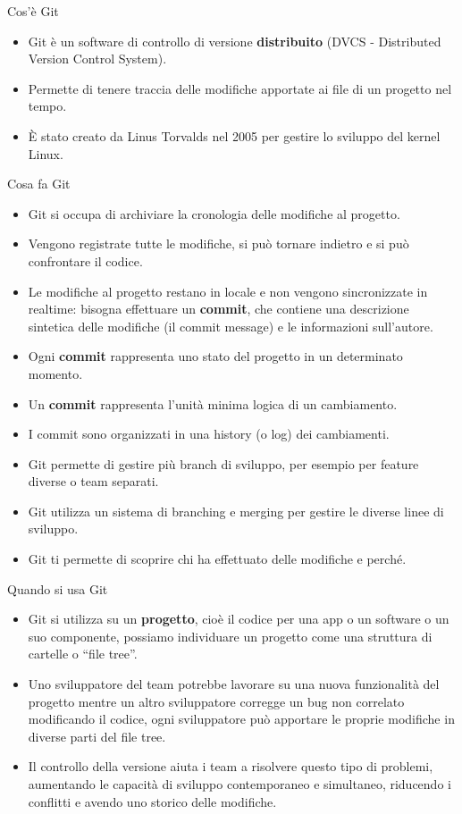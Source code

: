 \documentclass[aspectratio=169,handout,10pt]{beamer}
\begin{document}
\begin{frame}{Cos'è Git}
    \begin{itemize}
        \item Git è un software di controllo di versione \textbf{distribuito} (DVCS - Distributed Version Control System).
        \item Permette di tenere traccia delle modifiche apportate ai file di un progetto nel tempo.
        \item È stato creato da Linus Torvalds nel 2005 per gestire lo sviluppo del kernel Linux.
    \end{itemize}
\end{frame}
\begin{frame}{Cosa fa Git}
    \begin{itemize}
        \item Git si occupa di archiviare la cronologia delle modifiche al progetto.
        \item Vengono registrate tutte le modifiche, si può tornare indietro e si può confrontare il codice.
        \item Le modifiche al progetto restano in locale e non vengono sincronizzate in realtime: bisogna effettuare un \textbf{commit}, che contiene una descrizione sintetica delle modifiche (il commit message) e le informazioni sull'autore.
        \item Ogni \textbf{commit} rappresenta uno stato del progetto in un determinato momento.
        \item Un \textbf{commit} rappresenta l'unità minima logica di un cambiamento.
        \item I commit sono organizzati in una history (o log) dei cambiamenti.
        \item Git permette di gestire più branch di sviluppo, per esempio per feature diverse o team separati.
        \item Git utilizza un sistema di branching e merging per gestire le diverse linee di sviluppo.
        \item Git ti permette di scoprire chi ha effettuato delle modifiche e perché.
    \end{itemize}
\end{frame}
\begin{frame}{Quando si usa Git}
    \begin{itemize}
        \item Git si utilizza su un \textbf{progetto}, cioè il codice per una app o un software o un suo componente, possiamo individuare un progetto come una struttura di cartelle o ``file tree''.
        \item Uno sviluppatore del team potrebbe lavorare su una nuova funzionalità del progetto mentre un altro sviluppatore corregge un bug non correlato modificando il codice, ogni sviluppatore può apportare le proprie modifiche in diverse parti del file tree.
        \item Il controllo della versione aiuta i team a risolvere questo tipo di problemi, aumentando le capacità di sviluppo contemporaneo e simultaneo, riducendo i conflitti e avendo uno storico delle modifiche.
    \end{itemize}
\end{frame}
\end{document}
